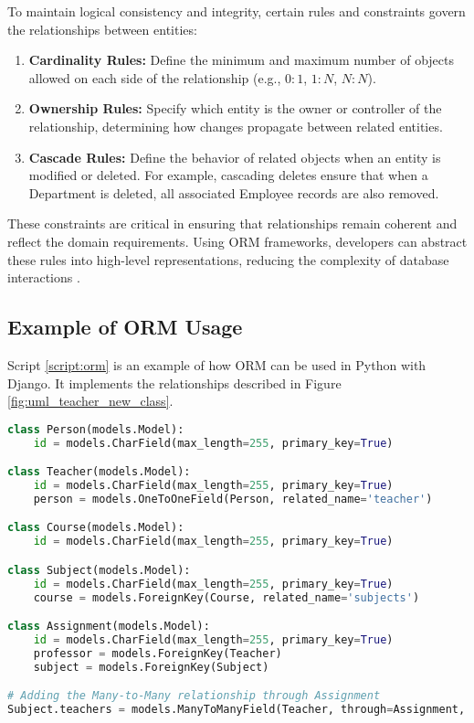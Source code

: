 To maintain logical consistency and integrity, certain rules and constraints govern the relationships between entities:
\begin{enumerate}
    \item \textbf{Cardinality Rules:} Define the minimum and maximum number of objects allowed on each side of the relationship (e.g., \(0:1\), \(1:N\), \(N:N\)).
    \item \textbf{Ownership Rules:} Specify which entity is the owner or controller of the relationship, determining how changes propagate between related entities.
    \item \textbf{Cascade Rules:} Define the behavior of related objects when an entity is modified or deleted. For example, cascading deletes ensure that when a {Department} is deleted, all associated {Employee} records are also removed.
\end{enumerate}

These constraints are critical in ensuring that relationships remain coherent and reflect the domain requirements. Using ORM frameworks, developers can abstract these rules into high-level representations, reducing the complexity of database interactions \cite{larman2004applying}.


\subsection{Example of ORM Usage}
Script \ref{script:orm} is an example of how ORM can be used in Python with Django. It implements the relationships described in Figure \ref{fig:uml_teacher_new_class}.


\begin{lstlisting}[language=Python, caption={Example of ORM usage in Python with Django.}, label={script:orm}]
class Person(models.Model):
    id = models.CharField(max_length=255, primary_key=True)

class Teacher(models.Model):
    id = models.CharField(max_length=255, primary_key=True)
    person = models.OneToOneField(Person, related_name='teacher')

class Course(models.Model):
    id = models.CharField(max_length=255, primary_key=True)

class Subject(models.Model):
    id = models.CharField(max_length=255, primary_key=True)
    course = models.ForeignKey(Course, related_name='subjects')

class Assignment(models.Model):
    id = models.CharField(max_length=255, primary_key=True)
    professor = models.ForeignKey(Teacher)
    subject = models.ForeignKey(Subject)

# Adding the Many-to-Many relationship through Assignment
Subject.teachers = models.ManyToManyField(Teacher, through=Assignment, related_name='subjects')

\end{lstlisting}

